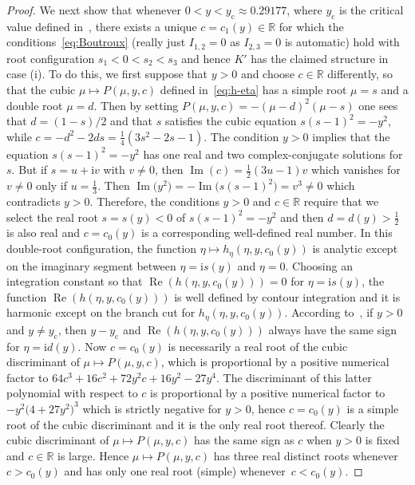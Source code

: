 \documentclass[11pt]{article}
\numberwithin{equation}{section}
\numberwithin{equation}{section}
\begin{document}
\begin{proof}
We next show that whenever $0<y<y_\mathrm{c}\approx 0.29177$, where $y_\mathrm{c}$ is the critical value defined in~\cite[Section 4.6]{BuckinghamM22}, there exists a unique $c=c_1(y)\in\mathbb{R}$ for which the conditions~\eqref{eq:Boutroux} (really just $I_{1,2}=0$ as $I_{2,3}=0$ is automatic) hold with root configuration $s_1<0<s_2<s_3$ and hence $K'$ has the claimed structure in case (i). To do this, we first suppose that $y>0$ and choose $c\in\mathbb{R}$ differently, so that the cubic $\mu\mapsto P(\mu,y,c)$ defined in~\eqref{eq:h-eta} has a simple root $\mu=s$ and a double root $\mu=d$.
Then by setting $P(\mu,y,c)=-(\mu-d)^2(\mu-s)$ one sees that $d=(1-s)/2$ and that $s$ satisfies the cubic equation $s(s-1)^2=-y^2$, while $c=-d^2-2ds=\frac{1}{4}(3s^2-2s-1)$. The condition $y>0$ implies that the equation $s(s-1)^2=-y^2$ has one real and two complex-conjugate solutions for $s$. But if $s=u+\mathrm{i} v$ with $v\neq 0$, then $\operatorname{Im}(c)=\frac{1}{2}(3u-1)v$ which vanishes for $v\neq 0$ only if $u=\frac{1}{3}$. Then $\operatorname{Im}\bigl(y^2\bigr)=-\operatorname{Im}\bigl(s(s-1)^2\bigr)=v^3\neq 0$ which contradicts $y>0$. Therefore, the conditions $y>0$ and $c\in\mathbb{R}$ require that we select the real root $s=s(y)<0$ of $s(s-1)^2=-y^2$ and then $d=d(y)>\frac{1}{2}$ is also real and $c=c_0(y)$ is a corresponding well-defined real number. In this double-root configuration, the function $\eta\mapsto h_\eta(\eta,y,c_0(y))$ is analytic except on the imaginary segment between $\eta=\mathrm{i} s(y)$ and $\eta=0$. Choosing an integration constant so that $\operatorname{Re}(h(\eta,y,c_0(y)))=0$ for $\eta=\mathrm{i} s(y)$, the function $\operatorname{Re}(h(\eta,y,c_0(y)))$ is well defined by contour integration and it is harmonic except on the branch cut for $h_\eta(\eta,y,c_0(y))$. According to~\cite[Section 4.6]{BuckinghamM22}, if $y>0$ and $y\neq y_\mathrm{c}$, then $y-y_\mathrm{c}$ and $\operatorname{Re}(h(\eta,y,c_0(y)))$ always have the same sign for $\eta=\mathrm{i} d(y)$. Now $c=c_0(y)$ is necessarily a real root of the cubic discriminant of $\mu\mapsto P(\mu,y,c)$, which is proportional by a positive numerical factor to $64 c^3+16c^2+72y^2c + 16y^2-27y^4$. The discriminant of this latter polynomial with respect to $c$ is proportional by a positive numerical factor to $-y^2\bigl(4+27y^2\bigr)^3$ which is strictly negative for $y>0$, hence $c=c_0(y)$ is a simple root of the cubic discriminant and it is the only real root thereof. Clearly the cubic discriminant of $\mu\mapsto P(\mu,y,c)$ has the same sign as $c$ when $y>0$ is fixed and $c\in\mathbb{R}$ is large. Hence $\mu\mapsto P(\mu,y,c)$ has three real distinct roots whenever $c>c_0(y)$ and has only one real root (simple) whenever~${c<c_0(y)}$.


\end{proof}
\end{document}
